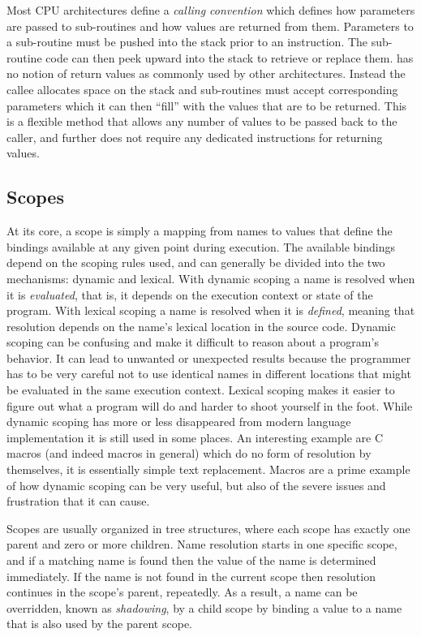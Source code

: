 Most CPU architectures define a \textit{calling convention} which defines how
parameters are passed to sub-routines and how values are returned from
them. Parameters to a sub-routine must be pushed into the stack prior to an
 instruction. The sub-routine code can then peek upward into the
stack to retrieve or replace them. \thename{} has no notion of return values as
commonly used by other architectures. Instead the callee allocates space on the
stack and sub-routines must accept corresponding parameters which it can then
``fill'' with the values that are to be returned. This is a flexible method that
allows any number of values to be passed back to the caller, and further does
not require any dedicated instructions for returning values.

\subsection{Scopes}
\label{sec:design:scopes}

At its core, a scope is simply a mapping from names to values that define the
bindings available at any given point during execution. The available bindings
depend on the scoping rules used, and can generally be divided into the two
mechanisms: dynamic and lexical. With dynamic scoping a name is resolved when it
is \emph{evaluated}, that is, it depends on the execution context or state of
the program. With lexical scoping a name is resolved when it is \emph{defined},
meaning that resolution depends on the name's lexical location in the source
code. Dynamic scoping can be confusing and make it difficult to reason about a
program's behavior. It can lead to unwanted or unexpected results because the
programmer has to be very careful not to use identical names in different
locations that might be evaluated in the same execution context. Lexical scoping
makes it easier to figure out what a program will do and harder to shoot
yourself in the foot. While dynamic scoping has more or less disappeared from
modern language implementation\cite{cse341} it is still used in some places. An
interesting example are C macros (and indeed macros in general) which do no form
of resolution by themselves, it is essentially simple text replacement. Macros
are a prime example of how dynamic scoping can be very useful, but also of the
severe issues and frustration that it can cause.

Scopes are usually organized in tree structures, where each scope has exactly
one parent and zero or more children. Name resolution starts in one specific
scope, and if a matching name is found then the value of the name is determined
immediately. If the name is not found in the current scope then resolution
continues in the scope's parent, repeatedly. As a result, a name can be
overridden, known as \textit{shadowing}, by a child scope by binding a value to
a name that is also used by the parent scope.

